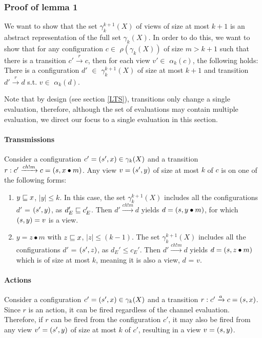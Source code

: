\subsubsection{Proof of lemma 1}
We want to show that the set $\gamma_k^{k+1}(X)$ of views of size at most $k+1$ is an abstract representation of the full set $\gamma_k(X)$. In order to do this, 
we want to show that for any configuration $c \in$ $\rho(\gamma_k(X))$ of size $m > k + 1$ such that there is a transition  $c' \xrightarrow{r} c$, then for each view $v' \in$ $\alpha_k(c)$, the following holds: There is a configuration $d'$ $\in$ $\gamma_k^{k+1}(X)$ of size at most $k+1$ and transition $ d' \xrightarrow{r} d$ s.t. $v \in$ $\alpha_k(d)$.

Note that by design (see section \ref{LTS}), transitions only change a single evaluation, therefore, although the set of evaluations may contain multiple evaluation, we direct our focus to a single evaluation in this section.

\paragraph{Transmissions}
\label{proofTransmission}
Consider a configuration $c' = (s', x) \in \gamma_k(X)$ and a transition $r: c' \xrightarrow{ch!m} c = (s,x \bullet m)$. Any view $v = (s', y)$ of size at most $k$ of $c$ is on one of the following forms:

\begin{enumerate}
\item
$y \sqsubseteq x$, $|y| \leq k$. In this case, the set $\gamma_k^{k+1}(X)$ includes all the configurations $d'$ = $(s', y)$, as $d_E' \sqsubseteq c_E'$. Then $d' \xrightarrow{ch!m} d$ yields $d = (s, y\bullet m)$, for which $(s, y) = v$ is a view.
\item
$y = z\bullet m$ with $z \sqsubseteq x$, $|z| \leq (k-1)$. The set $\gamma_k^{k+1}(X)$ includes all the configurations $d'$ = $(s', z)$, as $d_E' \leq c_E'$. Then $d' \xrightarrow{ch!m} d$ yields $d = (s, z\bullet m)$ which is of size at most $k$, meaning it is also a view, $d$ = $v$.
\end{enumerate}


\paragraph{Actions}
Consider a configuration $c' = (s', x) \in \gamma_k(X)$ and a transition $r: c' \xrightarrow{a} c = (s, x)$. Since $r$ is an action, it can be fired regardless of the channel evaluation. Therefore, if $r$ can be fired from the configuration $c'$, it may also be fired from any view $v' = (s', y)$ of size at most $k$ of $c'$, resulting in a view $v =  (s, y)$.

